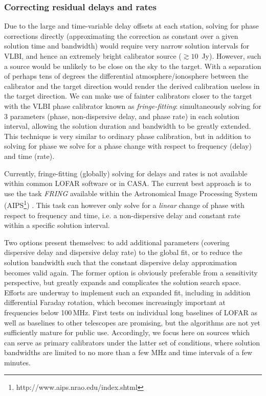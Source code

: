 \documentclass[graybox]{svmult}
\begin{document}
\subsubsection{Correcting residual delays and rates}
\label{sec:calibration}
Due to the large and time-variable delay offsets at each station, solving for
phase corrections directly (approximating the correction as constant over a
given solution time and bandwidth) would require very narrow solution intervals
for VLBI, and hence an extremely bright calibrator source ($\gtrsim10$~Jy).
However, such a source would be unlikely to be close on the sky to the target.
With a separation of perhaps tens of degrees the differential
atmosphere/ionosphere between the calibrator and the target direction would
render the derived calibration useless in the target direction. We can make use
of fainter calibrators closer to the target with the VLBI phase calibrator
known as \emph{fringe-fitting}: simultaneously solving for 3 parameters (phase,
non-dispersive delay, and phase rate) in each solution interval, allowing the
solution duration and bandwidth to be greatly extended. This technique is 
very similar to ordinary phase calibration, but in addition to solving
for phase we solve for a phase change with respect to frequency (delay) and
time (rate). 

Currently, fringe-fitting (globally) solving for delays and rates is not
available within common LOFAR software or in CASA. The current best approach is
to use the task \emph{FRING} available within the Astronomical Image Processing
System (AIPS\footnote{http://www.aips.nrao.edu/index.shtml})
\citep{greisen03a}. This task can however only solve for a \emph{linear} change
of phase with respect to frequency and time, i.e. a non-dispersive delay and
constant rate within a specific solution interval. 

Two options present themselves: to add additional parameters (covering
dispersive delay and dispersive delay rate) to the global fit, or to reduce the
solution bandwidth such that the constant dispersive delay approximation
becomes valid again.  The former option is obviously preferable from a
sensitivity perspective, but greatly expands and complicates the solution
search space.  Efforts are underway to implement such an expanded fit,
including in addition differential Faraday rotation, which becomes increasingly
important at frequencies below 100\,MHz.  First tests on individual long
baselines of LOFAR as well as baselines to other telescopes are promising, but
the algorithms are not yet sufficiently mature for public use.
Accordingly, we focus here on sources which can serve as primary calibrators
under the latter set of conditions, where solution bandwidths are limited to no
more than a few MHz and time intervals of a few minutes.
\end{document}
